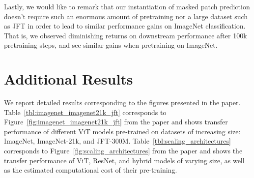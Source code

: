 \documentclass{article} \usepackage{iclr2021_conference,times}
\newcommand{\oursabbrv}{ViT\xspace}
\begin{document}
Lastly, we would like to remark that our instantiation of masked patch prediction doesn't require such an enormous amount of pretraining nor a large dataset such as JFT in order to lead to similar performance gains on ImageNet classification. That is, we observed diminishing returns on downstream performance after 100k pretraining steps, and see similar gains when pretraining on ImageNet.

\section{Additional Results}

We report detailed results corresponding to the figures presented in the paper.
Table~\ref{tbl:imagenet_imagenet21k_jft} corresponds to Figure~\ref{fig:imagenet_imagenet21k_jft} from the paper and shows transfer performance of different \oursabbrv models pre-trained on datasets of increasing size: ImageNet, ImageNet-21k, and JFT-300M.
Table~\ref{tbl:scaling_architectures} corresponds to Figure~\ref{fig:scaling_architectures} from the paper and shows the transfer performance of \oursabbrv{}, ResNet, and hybrid models of varying size, as well as the estimated computational cost of their pre-training.
\end{document}
